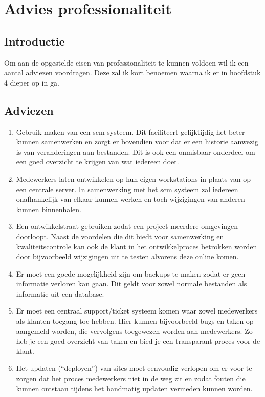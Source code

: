 \chapter{Advies professionaliteit}

\section{Introductie}

Om aan de opgestelde eisen van professionaliteit te kunnen voldoen wil ik een aantal adviezen voordragen. Deze zal ik kort benoemen waarna ik er in hoofdstuk 4 dieper op in ga.

\section{Adviezen}

\begin{enumerate}
  \item Gebruik maken van een {\sc scm} systeem. Dit faciliteert gelijktijdig het beter kunnen samenwerken en zorgt er bovendien voor dat er een historie aanwezig is van veranderingen aan bestanden. Dit is ook een onmisbaar onderdeel om een goed overzicht te krijgen van wat iedereen doet.
  \item Medewerkers laten ontwikkelen op hun eigen workstations in plaats van op een centrale server. In samenwerking met het {\sc scm} systeem zal iedereen onafhankelijk van elkaar kunnen werken en toch wijzigingen van anderen kunnen binnenhalen.
  \item Een ontwikkelstraat gebruiken zodat een project meerdere omgevingen doorloopt. Naast de voordelen die dit biedt voor samenwerking en kwaliteitscontrole kan ook de klant in het ontwikkelproces betrokken worden door bijvoorbeeld wijzigingen uit te testen alvorens deze online komen.
  \item Er moet een goede mogelijkheid zijn om backups te maken zodat er geen informatie verloren kan gaan. Dit geldt voor zowel normale bestanden als informatie uit een database.
  \item Er moet een centraal support/ticket systeem komen waar zowel medewerkers als klanten toegang toe hebben. Hier kunnen bijvoorbeeld bugs en taken op aangemeld worden, die vervolgens toegewezen worden aan medewerkers. Zo heb je een goed overzicht van taken en bied je een transparant proces voor de klant.
  \item Het updaten (``deployen'') van sites moet eenvoudig verlopen om er voor te zorgen dat het proces medewerkers niet in de weg zit en zodat fouten die kunnen ontstaan tijdens het handmatig updaten vermeden kunnen worden.
  
\end{enumerate}
